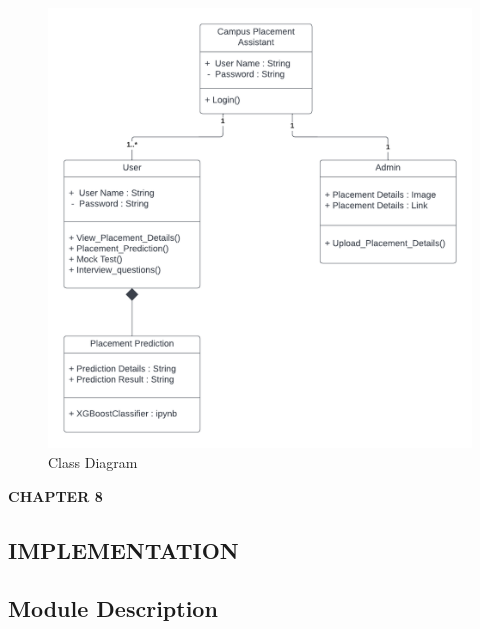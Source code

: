 \documentclass[12pt]{article}
\begin{document}
\begin{figure}[H]
\begin{center}
\includegraphics[scale=.6]{Class diagram}
\caption{Class Diagram}
\end{center}
\end{figure}

\newpage
\begin{flushleft}\textbf{CHAPTER 8} \end{flushleft}
\begin{flushleft}\section{IMPLEMENTATION} \end{flushleft}

\subsection{Module Description}
\end{document}
